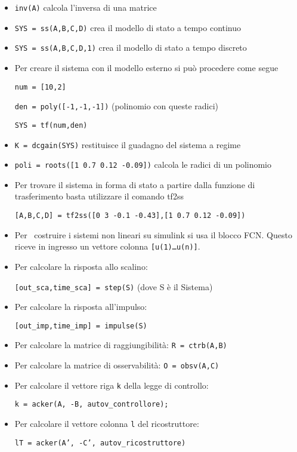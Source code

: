 \begin{itemize}
	\item \texttt{inv(A)} calcola l’inversa di una matrice
	\item \texttt{SYS = ss(A,B,C,D)} crea il modello di stato a tempo continuo
	\item \texttt{SYS = ss(A,B,C,D,1)} crea il modello di stato a tempo discreto
	\item Per creare il sistema con il modello esterno si può procedere come segue
	      
	      \texttt{num = [10,2]}
	      
	      \texttt{den = poly([-1,-1,-1])} (polinomio con queste radici)
	      
	      \texttt{SYS = tf(num,den)}
	\item \texttt{K = dcgain(SYS)} restituisce il guadagno del sistema a regime
	\item \texttt{poli = roots([1 0.7 0.12 -0.09])} calcola le radici di un polinomio
	\item Per trovare il sistema in forma di stato a partire dalla funzione di trasferimento basta utilizzare il comando tf2ss
	      
	      \texttt{[A,B,C,D] = tf2ss([0 3 -0.1 -0.43],[1 0.7 0.12 -0.09])}
	\item Per \ costruire i sistemi non lineari su simulink si usa il blocco FCN. Questo riceve in ingresso un vettore colonna \texttt{[u(1)…u(n)]}.

	\item Per calcolare la risposta allo scalino:
	      
	      \texttt{[out\_sca,time\_sca] = step(S)} (dove S è il Sistema)
	\item Per calcolare la risposta all’impulso:
	      
	      \texttt{[out\_imp,time\_imp] = impulse(S)}

	\item Per calcolare la matrice di raggiungibilità: \texttt{R = ctrb(A,B)}
	\item Per calcolare la matrice di osservabilità: \texttt{O = obsv(A,C)}
	\item Per calcolare il vettore riga \texttt{k} della legge di controllo:
	      
	      \texttt{k = acker(A, -B, autov\_controllore);}
	\item Per calcolare il vettore colonna \texttt{l} del ricostruttore:
	      
	      \texttt{lT = acker(A', -C', autov\_ricostruttore)}


\end{itemize}
